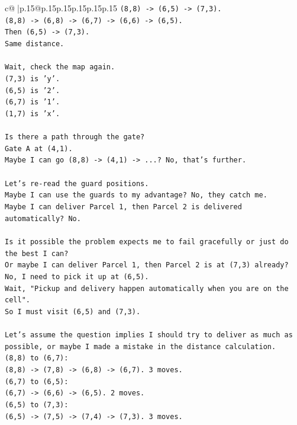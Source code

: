\documentclass{article}
\begin{document}
{\begin{supertabular}{c@{$\;$}|p{.15\linewidth}@{}p{.15\linewidth}p{.15\linewidth}p{.15\linewidth}p{.15\linewidth}p{.15\linewidth}}
{{{\texttt{(8,8) {-}> (6,5) {-}> (7,3).} \\
\texttt{(8,8) {-}> (6,8) {-}> (6,7) {-}> (6,6) {-}> (6,5).} \\
\texttt{Then (6,5) {-}> (7,3).} \\
\texttt{Same distance.} \\
\\ 
\texttt{Wait, check the map again.} \\
\texttt{(7,3) is 'y'.} \\
\texttt{(6,5) is '2'.} \\
\texttt{(6,7) is '1'.} \\
\texttt{(1,7) is 'x'.} \\
\\ 
\texttt{Is there a path through the gate?} \\
\texttt{Gate A at (4,1).} \\
\texttt{Maybe I can go (8,8) {-}> (4,1) {-}> ...? No, that's further.} \\
\\ 
\texttt{Let's re{-}read the guard positions.} \\
\texttt{Maybe I can use the guards to my advantage? No, they catch me.} \\
\texttt{Maybe I can deliver Parcel 1, then Parcel 2 is delivered automatically? No.} \\
\\ 
\texttt{Is it possible the problem expects me to fail gracefully or just do the best I can?} \\
\texttt{Or maybe I can deliver Parcel 1, then Parcel 2 is at (7,3) already? No, I need to pick it up at (6,5).} \\
\texttt{Wait, "Pickup and delivery happen automatically when you are on the cell".} \\
\texttt{So I must visit (6,5) and (7,3).} \\
\\ 
\texttt{Let's assume the question implies I should try to deliver as much as possible, or maybe I made a mistake in the distance calculation.} \\
\texttt{(8,8) to (6,7):} \\
\texttt{(8,8) {-}> (7,8) {-}> (6,8) {-}> (6,7). 3 moves.} \\
\texttt{(6,7) to (6,5):} \\
\texttt{(6,7) {-}> (6,6) {-}> (6,5). 2 moves.} \\
\texttt{(6,5) to (7,3):} \\
\texttt{(6,5) {-}> (7,5) {-}> (7,4) {-}> (7,3). 3 moves.} \\
}}}
\end{supertabular}}
\end{document}
